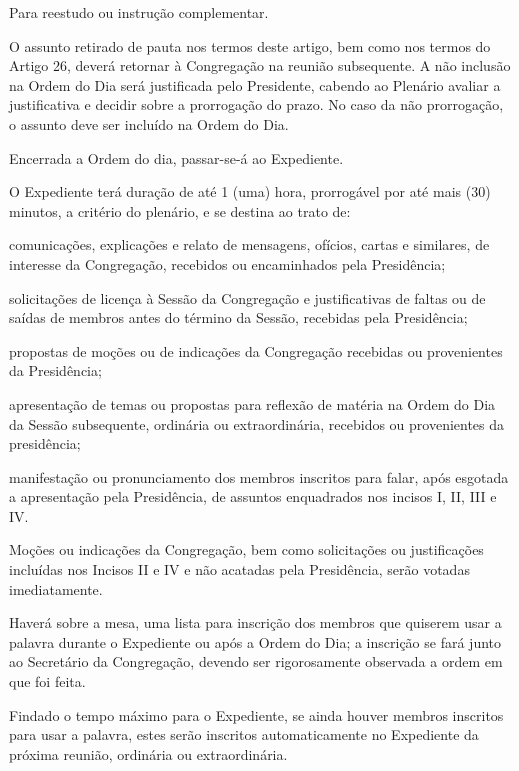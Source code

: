 \documentclass{documento}
\begin{document}
\inciso Para reestudo ou instrução complementar.

\paragrafounico O assunto retirado de pauta nos termos deste artigo, bem como nos termos do Artigo 26, deverá retornar à Congregação na reunião subsequente. A não inclusão na Ordem do Dia será justificada pelo Presidente, cabendo ao Plenário avaliar a justificativa e decidir sobre a prorrogação do prazo. No caso da não prorrogação, o assunto deve ser incluído na Ordem do Dia.


\artigo Encerrada a Ordem do dia, passar-se-á ao Expediente.

\artigo O Expediente terá duração de até 1 (uma) hora, prorrogável por até mais (30) minutos, a critério do plenário, e se destina ao trato de:

\inciso comunicações, explicações e relato de mensagens, ofícios, cartas e similares, de interesse da Congregação, recebidos ou encaminhados pela Presidência;

\inciso solicitações de licença à Sessão da Congregação e justificativas de faltas ou de saídas de membros antes do término da Sessão, recebidas pela Presidência;

\inciso propostas de moções ou de indicações da Congregação recebidas ou provenientes da Presidência;

\inciso apresentação de temas ou propostas para reflexão de matéria na Ordem do Dia da Sessão subsequente, ordinária ou extraordinária, recebidos ou provenientes da presidência;

\inciso manifestação ou pronunciamento dos membros inscritos para falar, após esgotada a apresentação pela Presidência, de assuntos enquadrados nos incisos I, II, III e IV.

\paragrafo Moções ou indicações da Congregação, bem como solicitações ou justificações incluídas nos Incisos II e IV e não acatadas pela Presidência, serão votadas imediatamente.

\paragrafo Haverá sobre a mesa, uma lista para inscrição dos membros que quiserem usar a palavra durante o Expediente ou após a Ordem do Dia; a inscrição se fará junto ao Secretário da Congregação, devendo ser rigorosamente observada a ordem em que foi feita.

\paragrafo Findado o tempo máximo para o Expediente, se ainda houver membros inscritos para usar a palavra, estes serão inscritos automaticamente no Expediente da próxima reunião, ordinária ou extraordinária.
\end{document}
